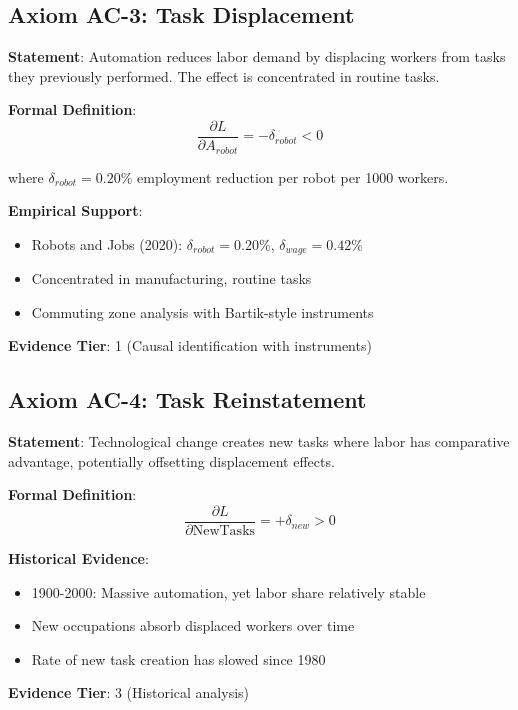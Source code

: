 \subsection{Axiom AC-3: Task Displacement}

\begin{tcolorbox}[colback=blue!5!white,colframe=blue!75!black,title=Axiom AC-3: Task Displacement Effect]
\textbf{Statement}: Automation reduces labor demand by displacing workers from tasks they previously performed. The effect is concentrated in routine tasks.

\textbf{Formal Definition}:
\begin{equation}
\frac{\partial L}{\partial A_{robot}} = -\delta_{robot} < 0
\end{equation}

where $\delta_{robot} = 0.20\%$ employment reduction per robot per 1000 workers.

\textbf{Empirical Support}:
\begin{itemize}
    \item Robots and Jobs (2020): $\delta_{robot} = 0.20\%$, $\delta_{wage} = 0.42\%$
    \item Concentrated in manufacturing, routine tasks
    \item Commuting zone analysis with Bartik-style instruments
\end{itemize}

\textbf{Evidence Tier}: 1 (Causal identification with instruments)
\end{tcolorbox}

\subsection{Axiom AC-4: Task Reinstatement}

\begin{tcolorbox}[colback=blue!5!white,colframe=blue!75!black,title=Axiom AC-4: Task Reinstatement Effect]
\textbf{Statement}: Technological change creates new tasks where labor has comparative advantage, potentially offsetting displacement effects.

\textbf{Formal Definition}:
\begin{equation}
\frac{\partial L}{\partial \text{NewTasks}} = +\delta_{new} > 0
\end{equation}

\textbf{Historical Evidence}:
\begin{itemize}
    \item 1900-2000: Massive automation, yet labor share relatively stable
    \item New occupations absorb displaced workers over time
    \item Rate of new task creation has slowed since 1980
\end{itemize}

\textbf{Evidence Tier}: 3 (Historical analysis)
\end{tcolorbox}

